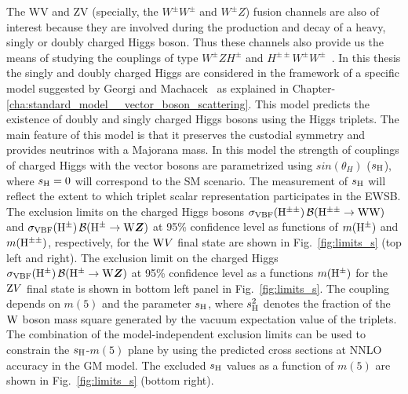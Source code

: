 The WV and ZV (specially, the $W^\pm W^\pm$ and $W^\pm Z$) fusion channels are also of interest because they are involved during the production and decay of a heavy, singly or doubly charged Higgs boson. Thus these channels also provide us the means of studying the couplings of type $W^\pm Z H^\pm$ and $H^{\pm \pm}W^\pm W^\pm$~\cite{Vega1990}. In this thesis the singly and doubly charged Higgs are considered in the framework of a specific model suggested by Georgi and Machacek~\cite{GEORGI1985463} as explained in Chapter-\ref{cha:standard_model__vector_boson_scattering}. This model predicts the existence of doubly and singly charged Higgs bosons using the Higgs triplets. The main feature of this model is that it preserves the custodial symmetry and provides neutrinos with a Majorana mass. 
In this model the strength of couplings of charged Higgs with the vector bosons are parametrized using $sin(\theta_H)$ ($s_{\mathrm{H}}$), where $s_{\mathrm{H}}=0$ will correspond to the SM scenario. The measurement of $s_{\mathrm{H}}$ will reflect the extent to which triplet scalar representation participates in the EWSB.
%
The exclusion limits on the charged Higgs bosons $\sigma_\mathrm{VBF}(\mathrm{H^{\pm\pm}}) \, \mathcal{B}(\mathrm{H^{\pm\pm}}\to \mathrm{W}\mathrm{W})$ and $\sigma_\mathrm{VBF}(\mathrm{H}^{\pm}) \, \mathcal{B}(\mathrm{H}^{\pm}\to \mathrm{W}\boldsymbol{Z})$ at 95\% confidence level as functions of $m(\mathrm{H}^{\pm})$ and $m(\mathrm{H^{\pm\pm}})$, respectively, for the $\mathrm{W} V$ final state are shown in Fig.~\ref{fig:limits_s} (top left and right).
The exclusion limit on the charged Higgs $\sigma_\mathrm{VBF}(\mathrm{H}^{\pm}) \, \mathcal{B}(\mathrm{H}^{\pm}\to \mathrm{W}\boldsymbol{Z})$ at 95\% confidence level as a functions $m(\mathrm{H}^{\pm})$ for the $\mathrm{Z} V$ final state is shown in bottom left panel in Fig.~\ref{fig:limits_s}.
The coupling depends on $m(5)$ and the parameter $s_{\mathrm{H}}$, where $s_{\mathrm{H}}^2$ denotes the fraction of the $\mathrm{W}$ boson mass square generated by the vacuum expectation value of the triplets.
The combination of the model-independent exclusion limits can be used to constrain the $s_{\mathrm{H}}$-$m(5)$ plane by using the predicted cross sections at NNLO accuracy in the GM model.
The excluded $s_{\mathrm{H}}$ values as a function of $m(5)$ are shown in Fig.~\ref{fig:limits_s} (bottom right).

